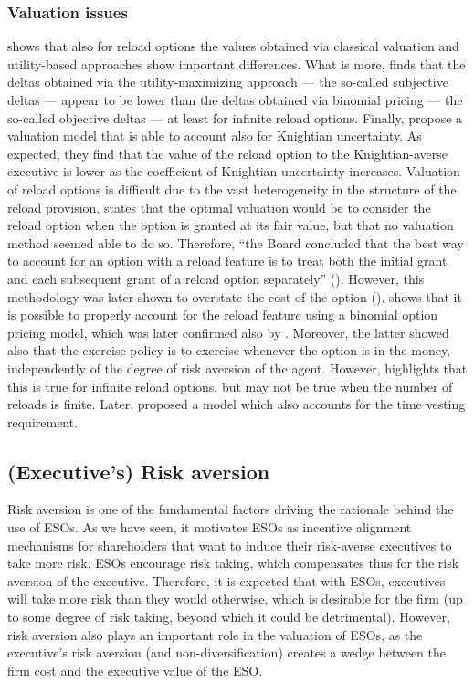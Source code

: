 \subsubsection{Valuation issues}
\cite{lau2005valuation} shows that also for reload options the values obtained via classical valuation and utility-based approaches show important differences. What is more, \cite{ingersoll2006valuing} finds that the deltas obtained via the utility-maximizing approach --- the so-called subjective deltas --- appear to be lower than the deltas obtained via binomial pricing --- the so-called objective deltas --- at least for infinite reload options. Finally, \cite{zhang2010knightian} propose a valuation model that is able to account also for Knightian uncertainty. As expected, they find that the value of the reload option to the Knightian-averse executive is lower as the coefficient of Knightian uncertainty increases.
Valuation of reload options is difficult due to the vast heterogeneity in the structure of the reload provision. \cite{fasb123} states that the optimal valuation would be to consider the reload option when the option is granted at its fair value, but that no valuation method seemed able to do so. Therefore, ``the Board concluded that the best way to account for an option with a reload feature is to treat both the initial grant and each subsequent grant of a reload option separately'' (\cite{fasb123}). However, this methodology was later shown to overstate the cost of the option (\cite{ingersoll2006valuing}). \cite{saly1999valuing} shows that it is possible to properly account for the reload feature using a binomial option pricing model, which was later confirmed also by \cite{hemmer2000reload}. Moreover, the latter showed also that the exercise policy is to exercise whenever the option is in-the-money, independently of the degree of risk aversion of the agent. However, \cite{saly1998ignoring} highlights that this is true for infinite reload options, but may not be true when the number of reloads is finite. Later, \cite{dai2005valuing} proposed a model which also accounts for the time vesting requirement.

\subsection{(Executive's) Risk aversion} %
    Risk aversion is one of the fundamental factors driving the rationale behind the use of ESOs. As we have seen, it motivates ESOs as incentive alignment mechanisms for shareholders that want to induce their risk-averse executives to take more risk. ESOs encourage risk taking, which compensates thus for the risk aversion of the executive. Therefore, it is expected that with ESOs, executives will take more risk than they would otherwise, which is desirable for the firm (up to some degree of risk taking, beyond which it could be detrimental). However, risk aversion also plays an important role in the valuation of ESOs, as the executive's risk aversion (and non-diversification) creates a wedge between the firm cost and the executive value of the ESO.

